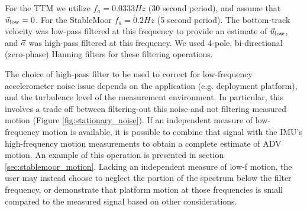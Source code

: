 \documentclass[twocol]{ametsoc}
\begin{document}
For the TTM we utilize $f_a = 0.0333 Hz$ (30 second period), and assume that $\vec{u}_\mathrm{low} = 0$. For the StableMoor $f_a = 0.2 Hz$ (5 second period). The bottom-track velocity was  low-pass filtered at this frequency to provide an estimate of $\vec{u}_\mathrm{low}$, and ${\vec{a}}$ was high-pass filtered at this frequency. We used 4-pole, bi-directional (zero-phase) Hanning filters for these filtering operations. 




The choice of high-pass filter to be used to correct for low-frequency accelerometer noise issue depends on the application (e.g. deployment platform), and the turbulence level of the measurement environment. In particular, this involves a trade off between filtering-out this noise and not filtering measured motion (Figure \ref{fig:stationary_noise}). If an independent measure of low-frequency motion is available, it is possible to combine that signal with the IMU's high-frequency motion measurements to obtain a complete estimate of ADV motion. An example of this operation is presented in section \ref{sec:stablemoor_motion}. Lacking an independent measure of low-f motion, the user may instead choose to neglect the portion of the spectrum below the filter frequency, or demonstrate that platform motion at those frequencies is small compared to the measured signal based on other considerations. 
\end{document}
